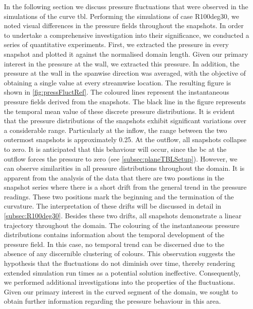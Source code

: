 In the following section we discuss pressure fluctuations  that were observed in the simulations of the curve \acrshort{tbl}.
Performing the simulations of case R100deg30, we noted visual differences in the pressure fields throughout the snapshots. 
In order to undertake a comprehensive investigation into their significance, we conducted a  series of quantitative experiments.
First, we extracted the pressure in every snapshot and plotted it against the normalised domain length.
Given our primary interest in the pressure at the wall,  we extracted this pressure.
In addition,  the pressure at the wall in the spanwise direction was averaged, with the objective of obtaining  a single value at every streamwise location.
The resulting figure is shown in \autoref{fig:pressFluctRef}.
The coloured lines represent the instantaneous pressure fields derived from the snapshots.
The black line in the figure represents the temporal mean value of these discrete pressure distributions.
It is evident that the pressure distributions of the snapshots exhibit significant variations over a considerable range.
 Particularly  at the inflow, the range between the two outermost snapshots is  approximately  0.25.
At the outflow, all snapshots collapse to zero.
It is anticipated that this behaviour will occur, since the \acrshort{bc} at the outflow forces the pressure to zero (see \autoref{subsec:planeTBLSetup}).
However, we can observe similarities in all pressure distributions throughout the domain.
It is apparent from the analysis of the data that there are two posstions in the snapshot series where there is a short drift  from the general trend in the pressure readings.
These two positions mark the beginning and the termination of the curvature.
The interpretation of these drifts will be discussed in detail in  \autoref{subsec:R100deg30}.
Besides these two drifts, all snapshots demonstrate a linear trajectory throughout the domain.
The colouring of the instantaneous pressure distributions contains information about the temporal development of the pressure field.
In this case, no temporal trend can be discerned due to the absence of any discernible clustering of colours.
This observation suggests the hypothesis that the fluctuations do not diminish over time, thereby rendering extended simulation run times as a potential solution ineffective.
Consequently, we performed additional investigations into the properties of the fluctuations.
Given our primary interest in the curved segment of the domain, we sought to obtain further information regarding the pressure behaviour in this area.

